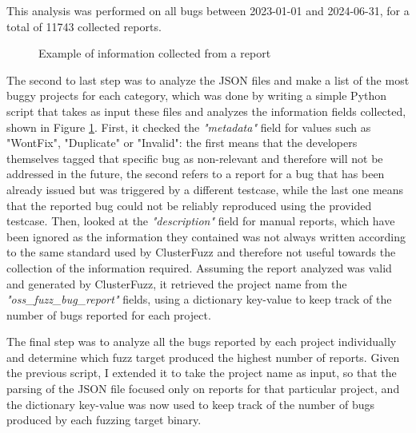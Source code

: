This analysis was performed on all bugs between 2023-01-01 and 2024-06-31, for a total of 11743 collected reports.

\begin{figure}[h]
\caption{Example of information collected from a report}
\label{fig:report}
\end{figure}


The second to last step was to analyze the JSON files and make a list of the most buggy projects for each category, which was done by writing a simple Python script that takes as input these files and analyzes the information fields collected, shown in Figure \ref{fig:report}. First, it checked the \textit{"metadata"} field for values such as "WontFix", "Duplicate" or "Invalid": the first means that the developers themselves tagged that specific bug as non-relevant and therefore will not be addressed in the future, the second refers to a report for a bug that has been already issued but was triggered by a different testcase, while the last one means that the reported bug could not be reliably reproduced using the provided testcase. Then, looked at the \textit{"description"} field for manual reports, which have been ignored as the information they contained was not always written according to the same standard used by ClusterFuzz and therefore not useful towards the collection of the information required. Assuming the report analyzed was valid and generated by ClusterFuzz, it retrieved the project name from the \textit{"oss\_fuzz\_bug\_report"} fields, using a dictionary key-value to keep track of the number of bugs reported for each project. 

\newpage
The final step was to analyze all the bugs reported by each project individually and determine which fuzz target produced the highest number of reports. Given the previous script, I extended it to take the project name as input, so that the parsing of the JSON file focused only on reports for that particular project, and the dictionary key-value was now used to keep track of the number of bugs produced by each fuzzing target binary. 
\newline

